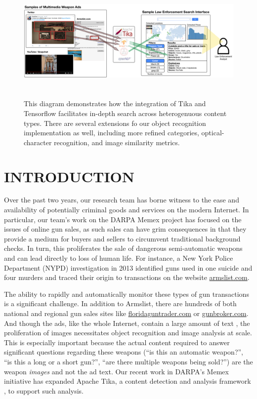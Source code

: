 \begin{figure}[!t]
  \centering
        \includegraphics[width=\textwidth,height=6cm]{interface-diagram}
        \caption{This diagram demonstrates how the integration of Tika and Tensorflow facilitates in-depth search across heterogenuous content types. There are several extensions fo our object recognition implementation as well, including more refined categories, optical-character recognition, and image similarity metrics.}
        \label{fig:interface-diagram}
\end{figure}
\section{INTRODUCTION}
Over the past two years, our research team has borne witness to the ease and availability of potentially criminal goods and services on the modern Internet. In particular, our team's work on the DARPA Memex project has focused on the issues of online gun sales, as such sales can have grim consequences in that they provide a medium for buyers and sellers to circumvent traditional background checks. In turn, this proliferates the sale of dangerous semi-automatic weapons and can lead directly to loss of human life. For instance, a New York Police Department (NYPD) investigation in 2013 identified guns used in one suicide and four murders and traced their origin to transactions on the website \url{armslist.com}\cite{raja_2016}. 

The ability to rapidly and automatically monitor these types of gun transactions is a significant challenge. In addition to Armslist, there are hundreds of both national and regional gun sales sites like \url{floridaguntrader.com} or \url{gunbroker.com}. And though the ads, like the whole Internet, contain a large amount of text \cite{mphillips-EOT2012}, the proliferation of images necessitates object recognition and image analysis at scale. This is especially important because the actual content required to answer significant questions regarding these weapons (``is this an automatic weapon?'', ``is this a long or a short gun?'', ``are there multiple weapons being sold?'') are the weapon {\em images} and not the ad text. Our recent work in DARPA's Memex initiative has expanded Apache Tika, a content detection and analysis framework \cite{mattmann2011tika}, to support such analysis.

